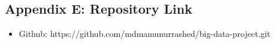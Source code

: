 \documentclass[12pt,a4paper]{article}
\begin{document}
\subsection*{Appendix E: Repository Link}
\begin{itemize}[leftmargin=2em]
  \item Github: https://github.com/mdmamunurrashed/big-data-project.git
\end{itemize}
\end{document}
